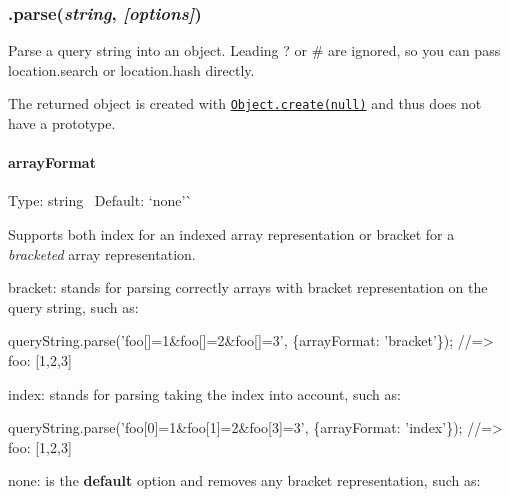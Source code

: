 \subsubsection*{.parse({\itshape string}, {\itshape \mbox{[}options\mbox{]}})}

Parse a query string into an object. Leading {\ttfamily ?} or {\ttfamily \#} are ignored, so you can pass {\ttfamily location.\+search} or {\ttfamily location.\+hash} directly.

The returned object is created with \href{https://developer.mozilla.org/en-US/docs/Web/JavaScript/Reference/Global_Objects/Object/create}{\tt {\ttfamily Object.\+create(null)}} and thus does not have a {\ttfamily prototype}.

\paragraph*{array\+Format}

Type\+: {\ttfamily string}~\newline
 Default\+: `\textquotesingle{}none'\`{}

Supports both {\ttfamily index} for an indexed array representation or {\ttfamily bracket} for a {\itshape bracketed} array representation.


\begin{DoxyItemize}
\item {\ttfamily bracket}\+: stands for parsing correctly arrays with bracket representation on the query string, such as\+:
\end{DoxyItemize}


\begin{DoxyCode}
queryString.parse('foo[]=1&foo[]=2&foo[]=3', \{arrayFormat: 'bracket'\});
//=> foo: [1,2,3]
\end{DoxyCode}



\begin{DoxyItemize}
\item {\ttfamily index}\+: stands for parsing taking the index into account, such as\+:
\end{DoxyItemize}


\begin{DoxyCode}
queryString.parse('foo[0]=1&foo[1]=2&foo[3]=3', \{arrayFormat: 'index'\});
//=> foo: [1,2,3]
\end{DoxyCode}



\begin{DoxyItemize}
\item {\ttfamily none}\+: is the {\bfseries default} option and removes any bracket representation, such as\+:
\end{DoxyItemize}


